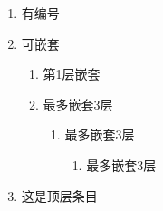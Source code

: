 \begin{enumerate}
  \item 有编号
  \item 可嵌套
  \begin{enumerate}
    \item 第1层嵌套
    \item 最多嵌套3层
    \begin{enumerate}
      \item 最多嵌套3层
        \begin{enumerate}
          \item 最多嵌套3层
        \end{enumerate}
    \end{enumerate}
  \end{enumerate}
  \item 这是顶层条目
\end{enumerate}


